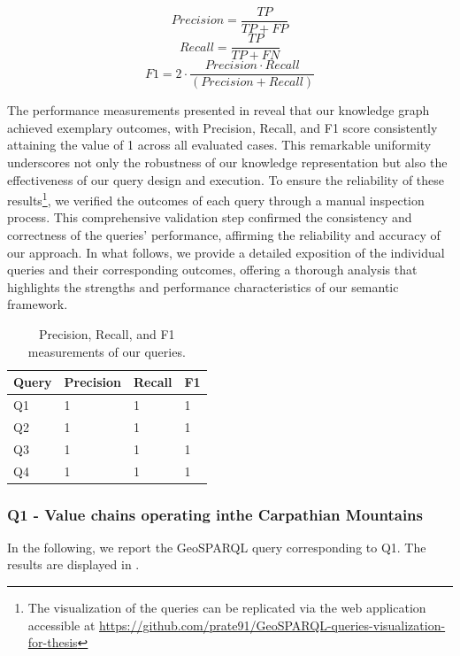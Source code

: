 \[
Precision = \frac{TP}{TP+FP}
\]
\[
Recall = \frac{TP}{TP+FN}
\]
\[
F1 = 2 \cdot \frac{Precision \cdot Recall}{(Precision+Recall)}
\]

The performance measurements presented in  reveal that our knowledge graph achieved exemplary outcomes, with Precision, Recall, and F1 score consistently attaining the value of 1 across all evaluated cases. This remarkable uniformity underscores not only the robustness of our knowledge representation but also the effectiveness of our query design and execution. To ensure the reliability of these results\footnote{The visualization of the queries can be replicated via the web application accessible at \url{https://github.com/prate91/GeoSPARQL-queries-visualization-for-thesis}}, we verified the outcomes of each query through a manual inspection process. This comprehensive validation step confirmed the consistency and correctness of the queries' performance, affirming the reliability and accuracy of our approach. In what follows, we provide a detailed exposition of the individual queries and their corresponding outcomes, offering a thorough analysis that highlights the strengths and performance characteristics of our semantic framework.


\begin{table}[H]
    \centering
        \caption{Precision, Recall, and F1 measurements of our queries.}
    \label{tab:evaluationQueries}
    \begin{tabular}{|l|l|l|l|}
    \hline
 Query & Precision & Recall & F1\\
\hline
        Q1 & 1 & 1 & 1\\ \hline
        Q2 & 1 & 1 & 1\\ \hline
        Q3 & 1 & 1 & 1 \\  \hline
        Q4 & 1 & 1 & 1 \\ \hline
    \end{tabular}
\end{table}

\subsubsection*{Q1 - Value chains operating inthe Carpathian Mountains}
In the following, we report the GeoSPARQL query corresponding to Q1. The results are displayed in .

